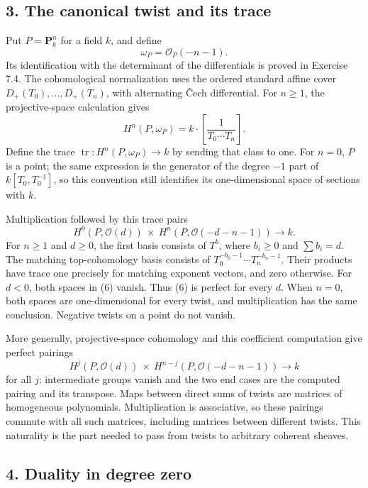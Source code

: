 \documentclass[11pt]{article}
\begin{document}
\subsection{3. The canonical twist and its
trace}\label{the-canonical-twist-and-its-trace}

Put \(P=\mathbf P^n_k\) for a field \(k\), and define \[
\omega_P=\mathcal O_P(-n-1).
\] Its identification with the determinant of the differentials is
proved in Exercise 7.4. The cohomological normalization uses the ordered
standard affine cover \(D_+(T_0),\ldots,D_+(T_n)\), with alternating
Čech differential. For \(n\geq1\), the projective-space calculation
gives \[
H^n(P,\omega_P)=k\cdot\left[\frac1{T_0\cdots T_n}\right].
\] Define the trace \(\operatorname{tr}:H^n(P,\omega_P)\to k\) by
sending that class to one. For \(n=0\), \(P\) is a point; the same
expression is the generator of the degree \(-1\) part of
\(k[T_0,T_0^{-1}]\), so this convention still identifies its
one-dimensional space of sections with \(k\).

Multiplication followed by this trace pairs \[
H^0(P,\mathcal O(d))\ \times\
H^n(P,\mathcal O(-d-n-1))\longrightarrow k.
\tag{6}
\] For \(n\geq1\) and \(d\geq0\), the first basis consists of \(T^b\),
where \(b_i\geq0\) and \(\sum b_i=d\). The matching top-cohomology basis
consists of \(T_0^{-b_0-1}\cdots T_n^{-b_n-1}\). Their products have
trace one precisely for matching exponent vectors, and zero otherwise.
For \(d<0\), both spaces in (6) vanish. Thus (6) is perfect for every
\(d\). When \(n=0\), both spaces are one-dimensional for every twist,
and multiplication has the same conclusion. Negative twists on a point
do not vanish.

More generally, projective-space cohomology and this coefficient
computation give perfect pairings \[
H^j(P,\mathcal O(d))\ \times\
H^{n-j}(P,\mathcal O(-d-n-1))\longrightarrow k
\] for all \(j\): intermediate groups vanish and the two end cases are
the computed pairing and its transpose. Maps between direct sums of
twists are matrices of homogeneous polynomials. Multiplication is
associative, so these pairings commute with all such matrices, including
matrices between different twists. This naturality is the part needed to
pass from twists to arbitrary coherent sheaves.

\subsection{4. Duality in degree zero}\label{duality-in-degree-zero}
\end{document}
